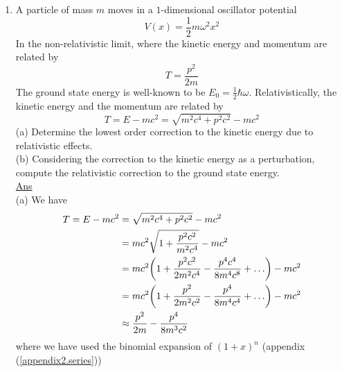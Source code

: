 \begin{enumerate}[label=Problem.\arabic*,start=1]
			
			\item 
			A particle of mass $m$ moves in a $1$-dimensional oscillator potential
			\begin{equation}
				V(x) = \frac{1}{2} m \omega^2 x^2
			\end{equation}
			In the non-relativistic limit, where the kinetic energy and momentum are related by
			\begin{equation}
				T = \frac{p^2}{2 m}
			\end{equation}
			The ground state energy is well-known to be $E_0=\frac{1}{2} \hbar \omega$. Relativistically, the kinetic energy and the momentum are related by
			\begin{equation}
				T = E - m c^2 = \sqrt{m^2 c^4 + p^2 c^2} - m c^2
			\end{equation}
			(a) Determine the lowest order correction to the kinetic energy due to relativistic effects.\\
			(b) Considering the correction to the kinetic energy as a perturbation, compute the relativistic correction to the ground state energy.\\
			
			\underline{Ans}\\
			(a) We have
			\begin{align*}
				T = E - mc^2 &= \sqrt{m^2 c^4 + p^2 c^2} - m c^2 \\
				&= mc^2 \sqrt{1 + \frac{p^2c^2}{m^2 c^4}} - mc^2 \\
				&= mc^2 \qty(1 + \frac{p^2 c^2}{2 m^2 c^4} - \frac{p^4 c^4}{8 m^4 c^8} + \ldots) - mc^2 \\
				&= mc^2 \qty(1 + \frac{p^2}{2 m^2 c^2} - \frac{p^4 }{8 m^4 c^4} + \ldots) - mc^2 \\
				&\approx \frac{p^2}{2 m} - \frac{p^4}{8 m^3 c^2}
			\end{align*}
			where we have used the binomial expansion of $(1+x)^n$ (appendix (\ref{appendix2.series}))
			

\end{enumerate}

